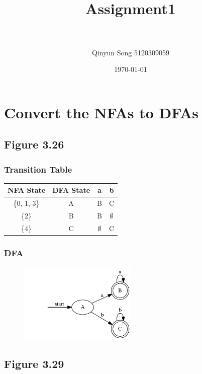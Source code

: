 \documentclass[paper=a4, fontsize=11pt]{scrartcl} %
\title{	
\normalfont \normalsize 
\horrule{0.5pt} \\[0.4cm] %
\huge Assignment1 \\ %
\horrule{2pt} \\[0.5cm] %
}
\author{Qinyun Song 5120309059} %
\date{\normalsize\today} %
\numberwithin{equation}{section} %
\numberwithin{figure}{section} %
\numberwithin{table}{section} %
\begin{document}
\maketitle %

\newpage
\section{Convert the NFAs to DFAs}
\subsection{Figure 3.26}
\subsubsection*{Transition Table}
\begin{table}[H]
\centering
\begin{tabular}{|c|c|c|c|}
\hline
NFA State & DFA State & a & b \\
\hline
\{0, 1, 3\} & A & B & C \\
\hline
\{2\} & B & B & $\emptyset$ \\
\hline
\{4\} & C & $\emptyset$ & C \\
\hline
\end{tabular}
\end{table}
\subsubsection*{DFA}
\begin{figure}[H]
\centering
\includegraphics[width=0.5\textwidth]{1_1.png}
\label{fig:1_1}
\end{figure}

\subsection{Figure 3.29}
\end{document}
